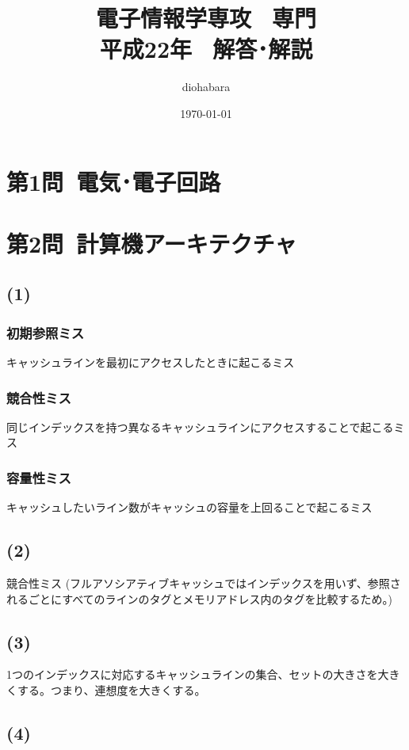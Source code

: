 \documentclass[a4paper,12pt,xelatex,ja=standard]{bxjsarticle}
\title{電子情報学専攻 \, 専門 \\ 平成22年 \, 解答･解説}
\author{diohabara}
\date{\today}
\begin{document}
\maketitle

\section*{第1問\ 電気･電子回路}

\section*{第2問\ 計算機アーキテクチャ}
\subsection*{(1)}
\subsubsection*{初期参照ミス}
キャッシュラインを最初にアクセスしたときに起こるミス

\subsubsection*{競合性ミス}
同じインデックスを持つ異なるキャッシュラインにアクセスすることで起こるミス

\subsubsection*{容量性ミス}
キャッシュしたいライン数がキャッシュの容量を上回ることで起こるミス

\subsection*{(2)}
競合性ミス
(フルアソシアティブキャッシュではインデックスを用いず、参照されるごとにすべてのラインのタグとメモリアドレス内のタグを比較するため。)

\subsection*{(3)}
1つのインデックスに対応するキャッシュラインの集合、セットの大きさを大きくする。つまり、連想度を大きくする。

\subsection*{(4)}
\end{document}
